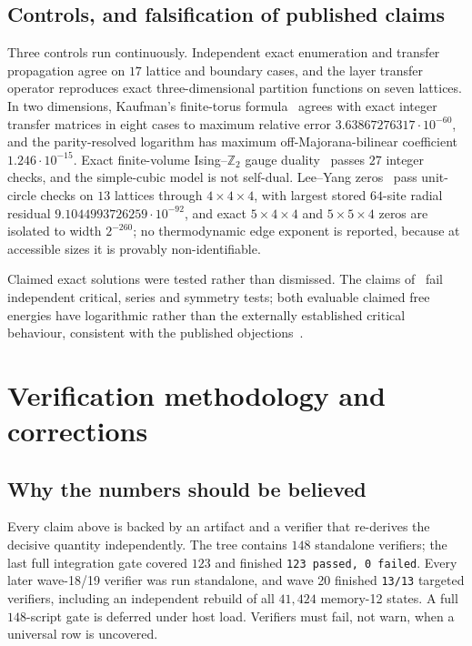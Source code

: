 \documentclass[11pt]{article}
\theoremstyle{definition}
\newcommand{\Zb}{\mathbb{Z}}
\begin{document}
\subsection{Controls, and falsification of published claims}
Three controls run continuously. Independent exact enumeration and transfer propagation agree on
$17$ lattice and boundary cases, and the layer transfer operator reproduces exact three-dimensional
partition functions on seven lattices. In two dimensions, Kaufman's finite-torus
formula~\cite{kaufman1949} agrees with exact integer transfer matrices in eight cases to maximum
relative error $3.63867276317\cdot10^{-60}$, and the parity-resolved logarithm has maximum
off-Majorana-bilinear coefficient $1.246\cdot10^{-15}$. Exact finite-volume Ising--$\Zb_2$ gauge
duality~\cite{wegner1971} passes $27$ integer checks, and the simple-cubic model is not self-dual.
Lee--Yang zeros~\cite{leeyang1952,yang1952} pass unit-circle checks on $13$ lattices through
$4\times4\times4$, with largest stored $64$-site radial residual $9.1044993726259\cdot10^{-92}$, and
exact $5\times4\times4$ and $5\times5\times4$ zeros are isolated to width $2^{-260}$; no thermodynamic
edge exponent is reported, because at accessible sizes it is provably non-identifiable.

Claimed exact solutions were tested rather than dismissed. The claims
of~\cite{zhang2007,zhang2021} fail independent critical, series and symmetry tests; both evaluable
claimed free energies have logarithmic rather than the externally established
critical behaviour, consistent with the published objections~\cite{wu2008comment,perk2022comment}.

\section{Verification methodology and corrections}\label{sec:corrections}

\subsection{Why the numbers should be believed}
Every claim above is backed by an artifact and a verifier that re-derives the decisive quantity
independently. The tree contains $148$ standalone verifiers; the last full integration gate covered
$123$ and finished \texttt{123 passed, 0 failed}. Every later wave-18/19 verifier was run standalone,
and wave 20 finished \texttt{13/13} targeted verifiers, including an independent rebuild of all
$41{,}424$ memory-12 states. A full $148$-script gate is deferred under host load. Verifiers must
fail, not warn, when a universal row is uncovered.
\end{document}
